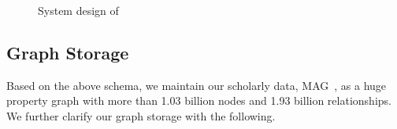 \begin{figure}
\centering
{}
\vspace{-1ex}
\caption{System design of \oursystem}
\label{fig:system}
\end{figure}


\subsection{Graph Storage} \label{subsec:storage}


Based on the above schema, we maintain our scholarly data, \ie MAG~\cite{sinha2015overview}, as a huge property graph with more than 1.03 billion nodes and 1.93 billion relationships. We further clarify our graph storage with the following.


